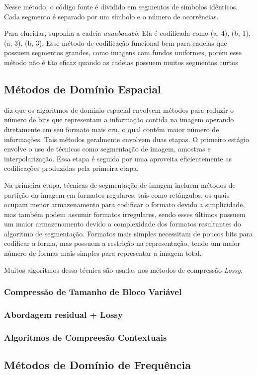 Nesse método, o código fonte é dividido em segmentos de símbolos idênticos. Cada segmento é separado por um símbolo e o número de ocorrências.

Para elucidar, suponha a cadeia {\em aaaabaaabb}. Ela é codificada como (a, 4), (b, 1), (a, 3), (b, 3). Esse método de codificação funcional bem para cadeias que possuem segmentos grandes, como imagens com fundos uniformes, porém esse método não é tão eficaz quando as cadeias possuem muitos segmentos curtos

\subsection{Métodos de Domínio Espacial}
\label{ss.transformmethod}

\citeauthor{pasteldeflango} diz que os algoritmos de domínio espacial envolvem métodos para reduzir o número de bits que representam a informação contida na imagem operando diretamente em seu formato mais cru, o qual contém maior número de informações. Tais métodos geralmente envolvem duas etapas. O primeiro estágio envolve o uso de técnicas como segmentação de imagem, amostras e interpolarização. Essa etapa é seguida por uma aproveita eficientemente as codificações produzidas pela primeira etapa.

Na primeira etapa, técnicas de segmentação de imagem incluem métodos de partição da imagem em formatos regulares, tais como retângulos, os quais ocupam menor armazenamento para codificar o formato devido a simplicidade, mas também podem assumir formatos irregulares, sendo esses últimos possuem um maior armazenamento devido a complexidade dos formatos resultantes do algoritmo de segmentação. Formatos mais simples necessitam de poucos bits para codificar a forma, mas possuem a restrição na representação, tendo um maior número de formas mais simples para representar a imagem total.

Muitos algoritmos dessa técnica são usadas nos métodos de compressão {\em Lossy}.

\subsubsection{Compressão de Tamanho de Bloco Variável}
\label{sss.variableblock}

\subsubsection{Abordagem residual + Lossy}
\label{sss.lossyresidual}

\subsubsection{Algoritmos de Compreesão Contextuais}
\label{sss.contextbased}

\subsection{Métodos de Domínio de Frequência}
\label{ss.transformmethod}
